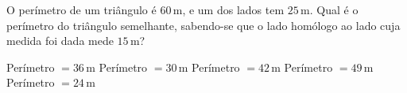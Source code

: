 O perímetro de um triângulo é $60$\,m, e um dos lados tem $25$\,m. Qual é o perímetro do triângulo semelhante, sabendo-se que o lado homólogo ao lado cuja medida foi dada mede $15$\,m?

Perímetro $=36$\,m
Perímetro $=30$\,m
Perímetro $=42$\,m
Perímetro $=49$\,m
Perímetro $=24$\,m





